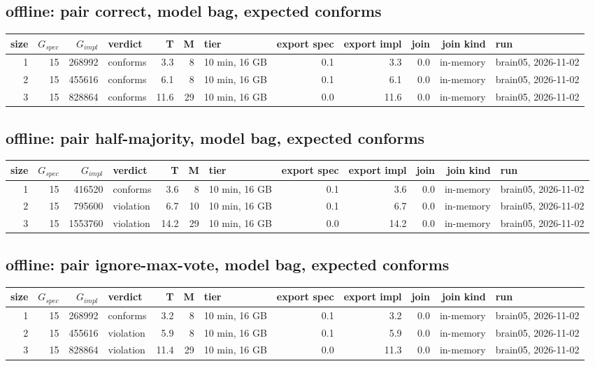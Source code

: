 \documentclass[10pt]{article}
\begin{document}
\subsection*{offline: pair \textsf{correct}, model bag, expected conforms}
\begin{longtable}{@{}rrrlrrlrrrrl@{}}
\toprule
size & $G_{\mathit{spec}}$ & $G_{\mathit{impl}}$ & verdict & T & M & tier & export spec & export impl & join & join kind & run \\
\midrule
\endhead
\color{red} 1 & 15 & 268992 & conforms & 3.3 & 8 & 10 min, 16 GB & 0.1 & 3.3 & 0.0 & in-memory & brain05, 2026-11-02 \\
\color{red} 2 & 15 & 455616 & conforms & 6.1 & 8 & 10 min, 16 GB & 0.1 & 6.1 & 0.0 & in-memory & brain05, 2026-11-02 \\
\color{red} 3 & 15 & 828864 & conforms & 11.6 & 29 & 10 min, 16 GB & 0.0 & 11.6 & 0.0 & in-memory & brain05, 2026-11-02 \\
\bottomrule
\end{longtable}
\subsection*{offline: pair \textsf{half-majority}, model bag, expected conforms}
\begin{longtable}{@{}rrrlrrlrrrrl@{}}
\toprule
size & $G_{\mathit{spec}}$ & $G_{\mathit{impl}}$ & verdict & T & M & tier & export spec & export impl & join & join kind & run \\
\midrule
\endhead
\color{red} 1 & 15 & 416520 & conforms & 3.6 & 8 & 10 min, 16 GB & 0.1 & 3.6 & 0.0 & in-memory & brain05, 2026-11-02 \\
\color{red} 2 & 15 & 795600 & violation & 6.7 & 10 & 10 min, 16 GB & 0.1 & 6.7 & 0.0 & in-memory & brain05, 2026-11-02 \\
\color{red} 3 & 15 & 1553760 & violation & 14.2 & 29 & 10 min, 16 GB & 0.0 & 14.2 & 0.0 & in-memory & brain05, 2026-11-02 \\
\bottomrule
\end{longtable}
\subsection*{offline: pair \textsf{ignore-max-vote}, model bag, expected conforms}
\begin{longtable}{@{}rrrlrrlrrrrl@{}}
\toprule
size & $G_{\mathit{spec}}$ & $G_{\mathit{impl}}$ & verdict & T & M & tier & export spec & export impl & join & join kind & run \\
\midrule
\endhead
\color{red} 1 & 15 & 268992 & conforms & 3.2 & 8 & 10 min, 16 GB & 0.1 & 3.2 & 0.0 & in-memory & brain05, 2026-11-02 \\
\color{red} 2 & 15 & 455616 & violation & 5.9 & 8 & 10 min, 16 GB & 0.1 & 5.9 & 0.0 & in-memory & brain05, 2026-11-02 \\
\color{red} 3 & 15 & 828864 & violation & 11.4 & 29 & 10 min, 16 GB & 0.0 & 11.3 & 0.0 & in-memory & brain05, 2026-11-02 \\
\bottomrule
\end{longtable}
\end{document}
